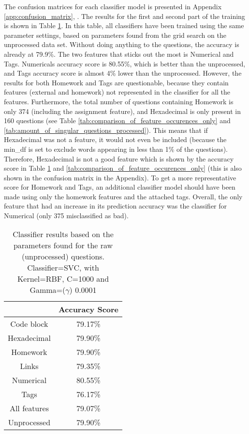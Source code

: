 The confusion matrices for each classifier model is presented in Appendix \ref{app:confusion_matrix}, \pageref{app:confusion_matrix}.
\vspace{0.5em}\newline
The results for the first and second part of the training is shown in Table \ref{tab:singular_feature_detector_so}.
In this table, all classifiers have been trained using the same parameter settings, based on parameters found from the grid search on the unprocessed data set.
Without doing anything to the questions, the accuracy is already at 79.9\%.
The two features that sticks out the most is Numerical and Tags. 
Numericals accuracy score is 80.55\%, which is better than the unprocessed, and Tags accuracy score is almost 4\% lower than the unprocessed.
However, the results for both Homework and Tags are questionable, because they contain features (external and homework) not represented in the classifier for all the features.
Furthermore, the total number of questions containing Homework is only 374 (including the assignment feature), and Hexadecimal is only present in 160 questions 
(see Table \ref{tab:comparison_of_feature_occurences_only} and \ref{tab:amount_of_singular_questions_processed}).
This means that if Hexadecimal was not a feature, it would not even be included (because the min\_df is set to exclude words appearing in less than 1\% of the questions).
Therefore, Hexadecimal is not a good feature which is shown by the accuracy score in Table \ref{tab:singular_feature_detector_so} and \ref{tab:comparison_of_feature_occurences_only} 
(this is also shown in the confusion matrix in the Appendix).
To get a more representative score for Homework and Tags, an additional classifier model should have been made using only the homework features and the attached tags.
Overall, the only feature that had an increase in its prediction accuracy was the classifier for Numerical (only 375 misclassified as bad).
\begin{table}[!h]%
	\centering
	\begin{tabular}{| c | c |}
		\hline
		~ 				& Accuracy Score	\\ \hline
		Code block 		& 79.17\%			\\ \hline
		Hexadecimal		& 79.90\%			\\ \hline
		Homework 		& 79.90\%			\\ \hline
		Links			& 79.35\%			\\ \hline				
		Numerical		& 80.55\%			\\ \hline
		Tags			& 76.17\%			\\ \hline
		All features	& 79.07\%			\\ \hline
		Unprocessed		& 79.90\%			\\ \hline
	\end{tabular}
	\caption{Classifier results based on the parameters found for the raw (unprocessed) questions. Classifier=SVC, with Kernel=RBF, C=1000 and Gamma=($\gamma$) 0.0001}	
	\label{tab:singular_feature_detector_so}
\end{table}
